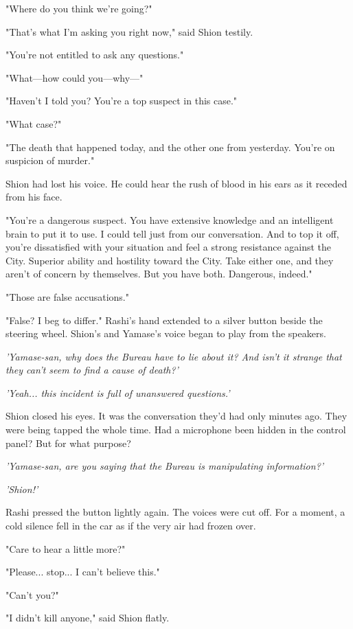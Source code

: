 "Where do you think we're going?"

"That's what I'm asking you right now," said Shion testily.

"You're not entitled to ask any questions."

"What---how could you---why---"

"Haven't I told you? You're a top suspect in this case."

"What case?"

"The death that happened today, and the other one from yesterday. You're
on suspicion of murder."

Shion had lost his voice. He could hear the rush of blood in his ears as
it receded from his face.

"You're a dangerous suspect. You have extensive knowledge and an
intelligent brain to put it to use. I could tell just from our
conversation. And to top it off, you're dissatisfied with your situation
and feel a strong resistance against the City. Superior ability and
hostility toward the City. Take either one, and they aren't of concern
by themselves. But you have both. Dangerous, indeed."

"Those are false accusations."

"False? I beg to differ." Rashi's hand extended to a silver button
beside the steering wheel. Shion's and Yamase's voice began to play from
the speakers.

\emph{'Yamase-san, why does the Bureau have to lie about it? And isn't it
strange that they can't seem to find a cause of death?'}

\emph{'Yeah... this incident is full of unanswered questions.'}

Shion closed his eyes. It was the conversation they'd had only minutes
ago. They were being tapped the whole time. Had a microphone been hidden
in the control panel? But for what purpose?

\emph{'Yamase-san, are you saying that the Bureau is manipulating
information?'}

\emph{'Shion!'}

Rashi pressed the button lightly again. The voices were cut off. For a
moment, a cold silence fell in the car as if the very air had frozen
over.

"Care to hear a little more?"

"Please... stop... I can't believe this."

"Can't you?"

"I didn't kill anyone," said Shion flatly.

